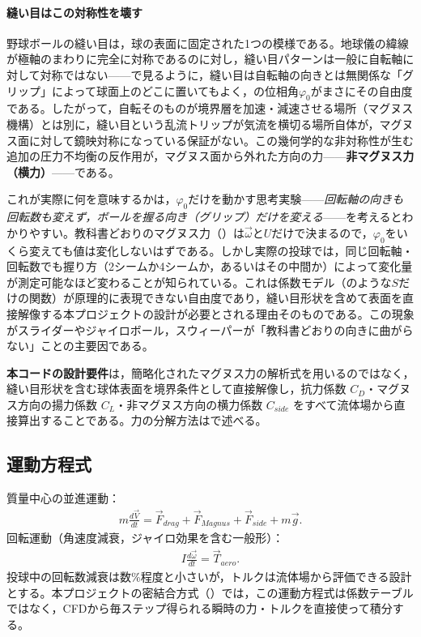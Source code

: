 \paragraph{縫い目はこの対称性を壊す}
野球ボールの縫い目は，球の表面に固定された1つの模様である。地球儀の緯線が極軸のまわりに完全に対称であるのに対し，縫い目パターンは一般に自転軸に対して対称ではない——で見るように，縫い目は自転軸の向きとは無関係な「グリップ」によって球面上のどこに置いてもよく，の位相角\(\varphi_0\)がまさにその自由度である。したがって，自転そのものが境界層を加速・減速させる場所（マグヌス機構）とは別に，縫い目という乱流トリップが気流を横切る場所自体が，マグヌス面に対して鏡映対称になっている保証がない。この幾何学的な非対称性が生む追加の圧力不均衡の反作用が，マグヌス面から外れた方向の力——\textbf{非マグヌス力（横力）}——である。

これが実際に何を意味するかは，\(\varphi_0\)だけを動かす思考実験——\emph{回転軸の向きも回転数も変えず，ボールを握る向き（グリップ）だけを変える}——を考えるとわかりやすい。教科書どおりのマグヌス力（）は\(\vec\omega\)と\(U\)だけで決まるので，\(\varphi_0\)をいくら変えても値は変化しないはずである。しかし実際の投球では，同じ回転軸・回転数でも握り方（2シームか4シームか，あるいはその中間か）によって変化量が測定可能なほど変わることが知られている。これは係数モデル（のような\(S\)だけの関数）が原理的に表現できない自由度であり，縫い目形状を含めて表面を直接解像する本プロジェクトの設計が必要とされる理由そのものである。この現象がスライダーやジャイロボール，スウィーパーが「教科書どおりの向きに曲がらない」ことの主要因である。

\textbf{本コードの設計要件}は，簡略化されたマグヌス力の解析式を用いるのではなく，縫い目形状を含む球体表面を境界条件として直接解像し，抗力係数 \(C_D\)・マグヌス方向の揚力係数 \(C_L\)・非マグヌス方向の横力係数 \(C_{side}\) をすべて流体場から直接算出することである。力の分解方法はで述べる。

\subsection{運動方程式}
\label{sec:eom}

質量中心の並進運動：
\begin{align}
	m\frac{d\vec V}{dt} = \vec F_{drag} + \vec F_{Magnus} + \vec F_{side} + m\vec g.
	\label{eq:translation}
\end{align}
回転運動（角速度減衰，ジャイロ効果を含む一般形）：
\begin{align}
	I\frac{d\vec\omega}{dt} = \vec T_{aero}.
	\label{eq:rotation}
\end{align}
投球中の回転数減衰は数\%程度と小さいが，トルクは流体場から評価できる設計とする。本プロジェクトの密結合方式（）では，この運動方程式は係数テーブルではなく，CFDから毎ステップ得られる瞬時の力・トルクを直接使って積分する。
